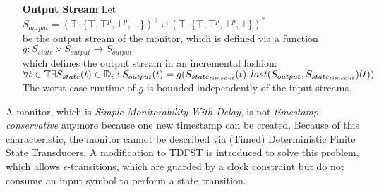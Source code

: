 \begin{definition}
\begin{itemize}
			\item[\textbf{Output Stream}]
				Let $S_{output}= (\mathbb{T}\cdot \{\top, \top^p, \bot^p, \bot\})^+\cup(\mathbb{T}\cdot \{\top, \top^p, \bot^p, \bot\})^*$\\
				be the output stream of the monitor, which is defined via a function\\
				$g:S_{state}\times S_{output}\rightarrow S_{output}$\\
				which defines the output stream in an incremental fashion:\\
				\begin{math}
					\forall t\in \mathbb T \exists S_{state}(t)\in\mathbb D_i:\\
					S_{output}(t)= g(S_{state_{timeout}}(t), last(S_{output}, S_{state_{timeout}})(t))
				\end{math} \\
				The worst-case runtime of $g$ is bounded independently of the input streams.
		\end{itemize}
	\end{definition}
		A monitor, which is \textit{Simple Monitorability With Delay}, is not \textit{timestamp conservative} anymore because one new timestamp can be created. Because of this characteristic, the monitor cannot be described via (Timed) Deterministic Finite State Transducers. A modification to TDFST is introduced to solve this problem, which allows $\epsilon$-transitions, which are guarded by a clock constraint but do not consume an input symbol to perform a state transition.
